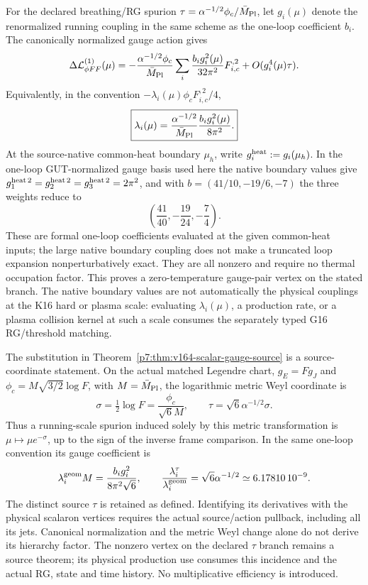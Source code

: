 \documentclass[12pt,a4paper]{article}
\begin{document}
\begin{theorem}
\label{p7:thm:v164-scalar-gauge-source}
For the declared breathing/RG spurion
\(\tau=\alpha^{-1/2}\phi_c/\bar M_{\rm Pl}\), let \(g_i(\mu)\) denote the
renormalized running coupling in the same scheme as the one-loop coefficient
\(b_i\).  The canonically normalized gauge action gives
\[
 \Delta\mathcal L_{\phi FF}^{(1)}(\mu)
 =-\frac{\alpha^{-1/2}\phi_c}{\bar M_{\rm Pl}}
 \sum_i\frac{b_i g_i^2(\mu)}{32\pi^2}F_{i,c}^{,2}
 +O(g_i^4(\mu)\tau).
\]
Equivalently, in the convention
\(-\lambda_i(\mu)\phi_c F_{i,c}^{,2}/4\),
\[
 \boxed{\lambda_i(\mu)=
 \frac{\alpha^{-1/2}}{\bar M_{\rm Pl}}
 \frac{b_i g_i^2(\mu)}{8\pi^2}.}
\]
At the source-native common-heat boundary \(\mu_h\), write
\(g_i^{\rm heat}:=g_i(\mu_h)\).  In the one-loop GUT-normalized gauge basis
used here the native boundary values give
\(g_1^{\rm heat\,2}=g_2^{\rm heat\,2}=g_3^{\rm heat\,2}=2\pi^2\), and with
\(b=(41/10,-19/6,-7)\) the three weights reduce to
\[
 \boxed{\left(\frac{41}{40},-\frac{19}{24},-\frac7{4}\right).}
\]
These are formal one-loop coefficients evaluated at the given common-heat inputs; the large native boundary coupling does not make a truncated loop expansion nonperturbatively exact.  They are all nonzero and require no thermal occupation factor.  This proves a
zero-temperature gauge-pair vertex on the stated branch.  The native boundary
values are not automatically the physical couplings at the K16 hard or plasma
scale: evaluating \(\lambda_i(\mu)\), a production rate, or a plasma collision
kernel at such a scale consumes the separately typed G16 RG/threshold matching.
\end{theorem}

\begin{remark}
\label{p7:rem:v2216-weyl-source-map}
The substitution in Theorem~\ref{p7:thm:v164-scalar-gauge-source} is a
source-coordinate statement.  On the actual matched Legendre chart,
$g_E=Fg_J$ and $\phi_c=M\sqrt{3/2}\log F$, with
$M=\bar M_{\rm Pl}$, the logarithmic metric Weyl coordinate is
\[
 \sigma=\tfrac12\log F=\frac{\phi_c}{\sqrt6M},
 \qquad \tau=\sqrt6\alpha^{-1/2}\sigma.
\]
Thus a running-scale spurion induced solely by this metric transformation
is $\mu\mapsto\mu e^{-\sigma}$, up to the sign of the inverse frame
comparison.  In the same one-loop convention its gauge coefficient is
\[
 \lambda_i^{\rm geom}M=\frac{b_i g_i^2}{8\pi^2\sqrt6},\qquad
 \frac{\lambda_i^\tau}{\lambda_i^{\rm geom}}
       =\sqrt6\alpha^{-1/2}\simeq6.17810\,10^{-9}.
\]
The distinct source $\tau$ is retained as defined.  Identifying its
derivatives with the physical scalaron vertices requires the actual
source/action pullback, including all its jets.  Canonical normalization
and the metric Weyl change alone do not derive its hierarchy factor.
The nonzero vertex on the declared $\tau$ branch remains a source theorem;
its physical production use consumes this incidence and the actual RG,
state and time history.  No multiplicative efficiency is introduced.
\end{remark}
\end{document}
